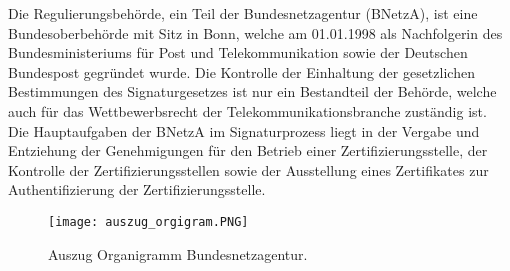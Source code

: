 Die Regulierungsbehörde, ein Teil der Bundesnetzagentur (BNetzA), ist eine Bundesoberbehörde mit Sitz in Bonn, welche am 01.01.1998 als Nachfolgerin des Bundesministeriums für Post und Telekommunikation sowie der Deutschen Bundespost gegründet wurde. Die Kontrolle der Einhaltung der gesetzlichen Bestimmungen des Signaturgesetzes ist nur ein Bestandteil der Behörde, welche auch für das Wettbewerbsrecht der Telekommunikationsbranche zuständig ist. Die Hauptaufgaben der BNetzA im Signaturprozess liegt in der Vergabe und Entziehung der Genehmigungen für den Betrieb einer Zertifizierungsstelle, der Kontrolle der Zertifizierungsstellen sowie der Ausstellung eines Zertifikates zur Authentifizierung der Zertifizierungsstelle. \cite{standdeswissens3}\cite{regBeh1}
\begin{figure}[!ht]
    \centering
    \texttt{[image: auszug\_orgigram.PNG]}
    \caption[Auszug Organigramm Bundesnetzagentur]{\small{Auszug Organigramm Bundesnetzagentur. \cite{BNetzA1}}}
\end{figure}